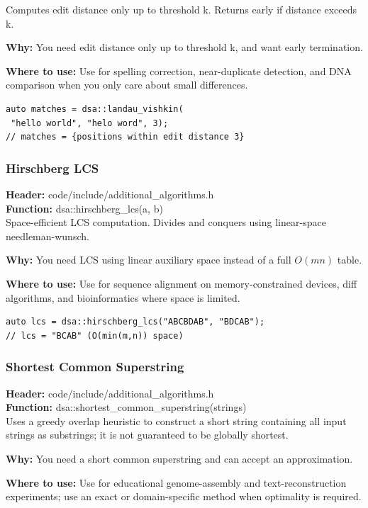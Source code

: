 \documentclass[11pt]{article}
\begin{document}
Computes edit distance only up to threshold k. Returns early if distance exceeds k.

\textbf{Why:} You need edit distance only up to threshold k, and want early termination. \par \textbf{Where to use:} Use for spelling correction, near-duplicate detection, and DNA comparison when you only care about small differences.

\begin{lstlisting}
auto matches = dsa::landau_vishkin(
 "hello world", "helo word", 3);
// matches = {positions within edit distance 3}
\end{lstlisting}

\subsubsection{Hirschberg LCS}
\textbf{Header:} code/include/additional\_algorithms.h\\
\textbf{Function:} dsa::hirschberg\_lcs(a, b)\\

Space-efficient LCS computation. Divides and conquers using linear-space needleman-wunsch.

\textbf{Why:} You need LCS using linear auxiliary space instead of a full \(O(mn)\) table. \par \textbf{Where to use:} Use for sequence alignment on memory-constrained devices, diff algorithms, and bioinformatics where space is limited.

\begin{lstlisting}
auto lcs = dsa::hirschberg_lcs("ABCBDAB", "BDCAB");
// lcs = "BCAB" (O(min(m,n)) space)
\end{lstlisting}

\subsubsection{Shortest Common Superstring}
\textbf{Header:} code/include/additional\_algorithms.h\\
\textbf{Function:} dsa::shortest\_common\_superstring(strings)\\

Uses a greedy overlap heuristic to construct a short string containing all input strings as substrings; it is not guaranteed to be globally shortest.

\textbf{Why:} You need a short common superstring and can accept an approximation. \par \textbf{Where to use:} Use for educational genome-assembly and text-reconstruction experiments; use an exact or domain-specific method when optimality is required.
\end{document}
